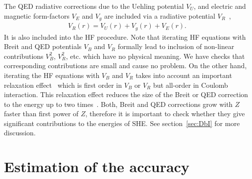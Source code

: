 \documentclass[8pt,a4paper, twoside]{report}
\begin{document}
The QED radiative corrections due to the Uehling potential $V_U$, and electric and magnetic form-factors 
$V_E $ and $ V_g$  are included via a radiative potential $V_R$~\cite{FG2005},
\begin{align}\label{eq:VR}
V_{R}(r) = V_{U}(r) + V_{g}(r) + V_{E}(r).
\end{align}
It is also included into the HF procedure.
Note that iterating  HF equations with Breit and QED potentials $V_B$ and $V_R$ formally lead to inclusion of non-linear
contributions  $V_B^2$, $V_R^2$, etc. which have no physical meaning. We have checks that corresponding contributions
are small and cause no problem. On the other hand, iterating the HF equations with $V_B$ and $V_R$ takes into account
an important relaxation effect~\cite{DF2016} which is first order in $V_B$ or $V_R$ but all-order in Coulomb interaction.
This relaxation effect reduces the size of the Breit or QED correction to the energy up to two times~\cite{DF2016}.
Both, Breit and QED corrections grow with $Z$ faster than first power of $Z$, therefore it is important to check whether
they give significant contributions to the energies of SHE. See section~\ref{sec:DbI} for more discussion. 
\section{Estimation of the accuracy} \label{sec:Accuracy}
\end{document}
